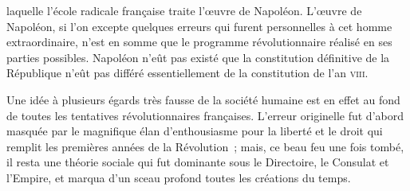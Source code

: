 \documentclass[french,twoside]{book} %
\begin{document}
laquelle l’école radicale française traite l’œuvre de Napoléon. L’œuvre de Napoléon, si l’on excepte quelques erreurs qui furent personnelles à cet homme extraordinaire, n’est en somme que le programme révolutionnaire réalisé en ses parties possibles. Napoléon n’eût pas existé que la constitution définitive de la République n’eût pas différé essentiellement de la constitution de l’an \textsc{viii}.\par
Une idée à plusieurs égards très fausse de la société humaine est en effet au fond de toutes les tentatives révolutionnaires françaises. L’erreur originelle fut d’abord masquée par le magnifique élan d’enthousiasme pour la liberté et le droit qui remplit les premières années de la Révolution ; mais, ce beau feu une fois tombé, il resta une théorie sociale qui fut dominante sous le Directoire, le Consulat et l’Empire, et marqua d’un sceau profond toutes les créations du temps.\par
\end{document}
